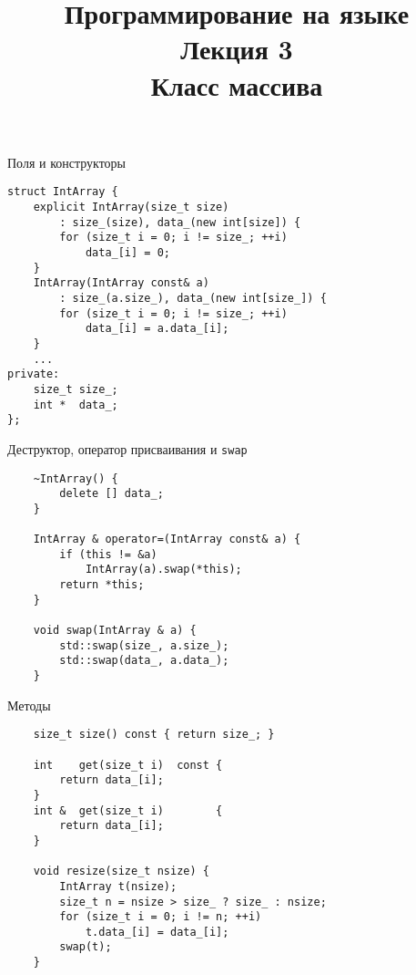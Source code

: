 \documentclass{beamer}
\title{{\bf Программирование на языке \langcpp\protect\\Лекция
3\protect\vspace{1em}\\}Класс массива}
\begin{document}
\begin{frame} 
  \titlepage
\end{frame}

\begin{frame}[fragile]{Поля и конструкторы}{}
\begin{lstlisting}
struct IntArray {
    explicit IntArray(size_t size) 
        : size_(size), data_(new int[size]) {
        for (size_t i = 0; i != size_; ++i)
            data_[i] = 0;
    }
    IntArray(IntArray const& a) 
        : size_(a.size_), data_(new int[size_]) {
        for (size_t i = 0; i != size_; ++i)
            data_[i] = a.data_[i];    
    }
    ...
private:
    size_t size_;
    int *  data_;
};
\end{lstlisting}
\end{frame}

\begin{frame}[fragile]{Деструктор, оператор присваивания и {\tt swap}}{}
\begin{lstlisting}
    ~IntArray() {
        delete [] data_;
    }

    IntArray & operator=(IntArray const& a) {
        if (this != &a)
            IntArray(a).swap(*this);
        return *this;
    }

    void swap(IntArray & a) {
        std::swap(size_, a.size_);
        std::swap(data_, a.data_);
    }
\end{lstlisting}
\end{frame}

\begin{frame}[fragile]{Методы}{}
\begin{lstlisting}
    size_t size() const { return size_; }

    int    get(size_t i)  const { 
        return data_[i]; 
    }
    int &  get(size_t i)        { 
        return data_[i]; 
    }

    void resize(size_t nsize) {
        IntArray t(nsize);
        size_t n = nsize > size_ ? size_ : nsize;
        for (size_t i = 0; i != n; ++i)
            t.data_[i] = data_[i];
        swap(t);
    }
\end{lstlisting}
\end{frame}
\end{document}
